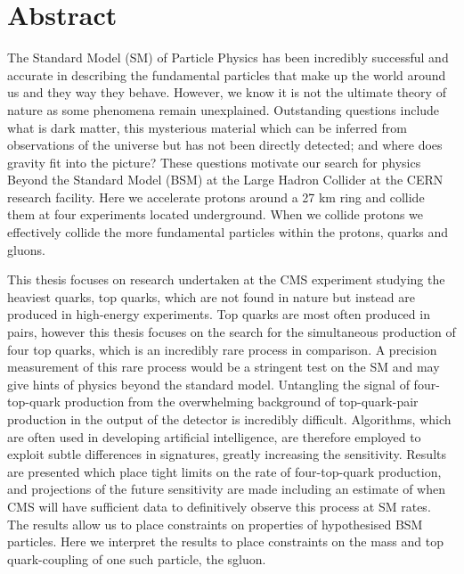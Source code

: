 \label{c:abstract}
\chapter*{Abstract} 
\small{
The Standard Model (SM) of Particle Physics has been incredibly successful and accurate in describing the fundamental particles that make up the world around us and they way they behave. However, we know it is not the ultimate theory of nature as some phenomena remain unexplained. Outstanding questions include what is dark matter, this mysterious material which can be inferred from observations of the universe but has not been directly detected; and where does gravity fit into the picture? These questions motivate our search for physics Beyond the Standard Model (BSM) at the Large Hadron Collider at the CERN research facility. Here we accelerate protons around a 27 km ring and collide them at four experiments located underground. When we collide protons we effectively collide the more fundamental particles within the protons, quarks and gluons.

This thesis focuses on research undertaken at the CMS experiment studying the heaviest quarks, top quarks, which are not found in nature but instead are produced in high-energy experiments. Top quarks are most often produced in pairs, however this thesis focuses on the search for the simultaneous production of four top quarks, which is an incredibly rare process in comparison. A precision measurement of this rare process would be a stringent test on the SM and may give hints of physics beyond the standard model. 
Untangling the signal of four-top-quark production from the overwhelming background of top-quark-pair production in the output of the detector is incredibly difficult. Algorithms, which are often used in developing artificial intelligence, are therefore employed to exploit subtle differences in signatures, greatly increasing the sensitivity.
Results are presented which place tight limits on the rate of four-top-quark production, and projections of the future sensitivity are made including an estimate of when CMS will have sufficient data to definitively observe this process at SM rates. The results allow us to place constraints on properties of hypothesised BSM particles. Here we interpret the results to place constraints on the mass and top quark-coupling of one such particle, the sgluon.}

\clearpage

